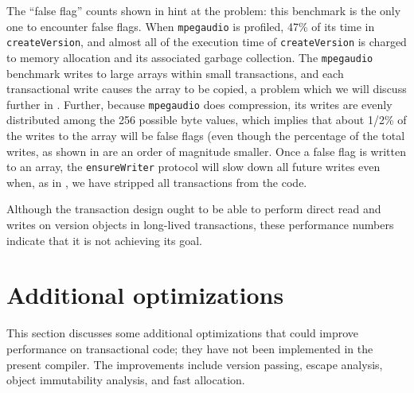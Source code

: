 The ``false flag'' counts shown in  hint at
the problem: this benchmark is the only one to encounter false
flags.  When \texttt{mpegaudio} is profiled, 47\% of its time in
\texttt{createVersion}, and almost all of the execution time of
\texttt{createVersion} is charged to memory allocation and its
associated garbage collection.  The \texttt{mpegaudio} benchmark
writes to large arrays within small transactions, and each
transactional write causes the array to be copied, a problem which we
will discuss further in .  Further, because
\texttt{mpegaudio} does compression, its writes are evenly distributed
among the 256 possible byte values, which implies that about 1/2\% of
the writes to the array will be false flags (even though the
percentage of the total writes, as shown in  are an
order of magnitude smaller.   Once a false flag is written to an
array, the \texttt{ensureWriter} protocol will slow down all future
writes even when, as in ,
we have stripped all transactions from the code.

Although the \apex transaction design ought to be able to perform direct
read and writes on version objects in long-lived transactions, these
performance numbers indicate that it is not achieving its goal.


\section{Additional optimizations}\label{sec:moreopt}

This section discusses some additional optimizations
that could improve performance on transactional code; they have
not been implemented in the present compiler.  The improvements
include version passing, escape analysis, object immutability
analysis, and fast allocation.

